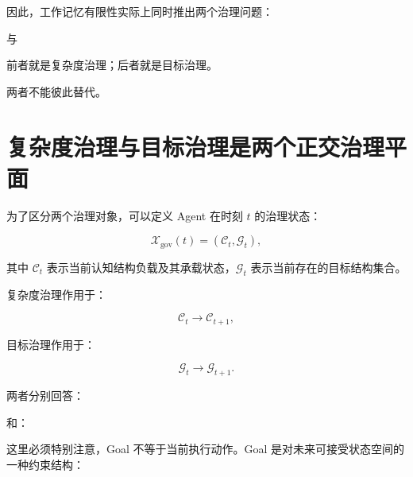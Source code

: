 因此，工作记忆有限性实际上同时推出两个治理问题：

\begin{statementbox}
\centering
{}
\end{statementbox}

与

\begin{statementbox}
\centering
{}
\end{statementbox}

前者就是复杂度治理；后者就是目标治理。

两者不能彼此替代。


\section{复杂度治理与目标治理是两个正交治理平面}

为了区分两个治理对象，可以定义 Agent 在时刻 $t$ 的治理状态：

\[
\boxed{
\mathcal X_{\mathrm{gov}}(t)
=
\left(
\mathcal C_t,
\mathcal G_t
\right),
}
\]

其中 $\mathcal C_t$ 表示当前认知结构负载及其承载状态，$\mathcal G_t$ 表示当前存在的目标结构集合。

复杂度治理作用于：

\[
\mathcal C_t
\longrightarrow
\mathcal C_{t+1},
\]

目标治理作用于：

\[
\mathcal G_t
\longrightarrow
\mathcal G_{t+1}.
\]

两者分别回答：

\begin{statementbox}
\centering
{}
\end{statementbox}

和：

\begin{statementbox}
\centering
{}
\end{statementbox}

这里必须特别注意，Goal 不等于当前执行动作。Goal 是对未来可接受状态空间的一种约束结构：

\begin{statementbox}
\centering
{}
\end{statementbox}

